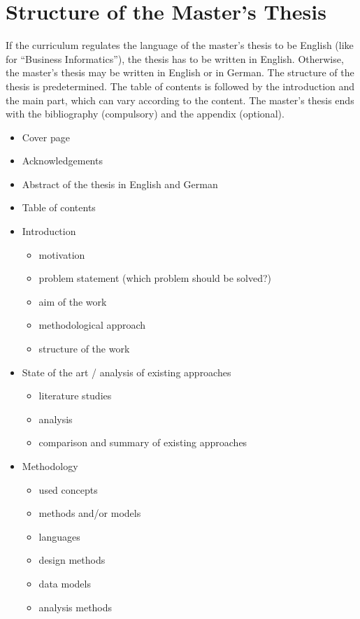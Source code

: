 \section{Structure of the Master's Thesis}

If the curriculum regulates the language of the master's thesis to be English
(like for ``Business Informatics''), the thesis has to be written in English.
Otherwise, the master's thesis may be written in English or in German.
The structure of the thesis is predetermined.
The table of contents is followed by the introduction and the main part, which
can vary according to the content.
The master's thesis ends with the bibliography (compulsory) and the appendix
(optional).

\begin{itemize}
  \item	Cover page
  \item Acknowledgements
  \item Abstract of the thesis in English and German
  \item Table of contents
  \item Introduction
  	\begin{itemize}
  		\item motivation
  		\item problem statement (which problem should be solved?)
  		\item aim of the work
  		\item methodological approach
  		\item structure of the work
  	\end{itemize}
  \item State of the art / analysis of existing approaches
  	\begin{itemize}
  		\item literature studies
  		\item analysis
  		\item comparison and summary of existing approaches
  	\end{itemize}
  \item Methodology
  	\begin{itemize}
  		\item used concepts
  		\item methods and/or models
  		\item languages
  		\item design methods
  		\item data models
  		\item analysis methods

\end{itemize}
\end{itemize}
